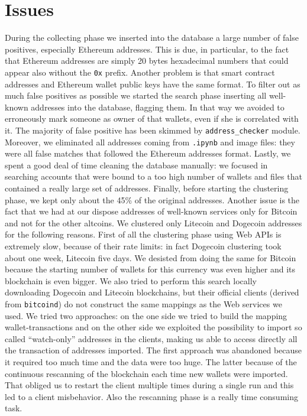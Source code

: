 \section{Issues} \label{sec:issues}
During the collecting phase we inserted into the database a large number of
false positives, especially Ethereum addresses. This is due, in particular, to
the fact that Ethereum addresses are simply 20 bytes hexadecimal numbers that
could appear also without the \texttt{0x} prefix. Another problem is that smart
contract addresses and Ethereum wallet public keys have the same format. To
filter out as much false positives as possible we started the search phase
inserting all well-known addresses into the database, flagging them. In that way
we avoided to erroneously mark someone as owner of that wallets, even if she is
correlated with it. The majority of false positive has been skimmed by
\texttt{address\_checker} module. Moreover, we eliminated all addresses coming
from \texttt{.ipynb} and image files: they were all false matches that
followed the Ethereum addresses format. Lastly, we spent a good deal of time
cleaning the database manually: we focused in searching accounts that were
bound to a too high number of wallets and files that contained
a really large set of addresses. 
Finally, before starting the clustering phase,
we kept only about the 45\% of the original addresses.
Another issue is the fact that we had at our dispose addresses
of well-known services only for Bitcoin and not for the other altcoins.
We clustered only Litecoin and Dogecoin addresses for the following reasons.
First of all the clustering phase using Web APIs is extremely slow, because of
their rate limits: in fact Dogecoin clustering took about one week, Litecoin
five days.
We desisted from doing the same for Bitcoin because the starting number of
wallets for this currency was even higher and its blockchain is even bigger. We
also tried to perform this search locally downloading Dogecoin and Litecoin
blockchains, but their official clients (derived from \texttt{bitcoind}) do not
construct the same mappings as the Web services we used. We tried two
approaches: on the one side we tried to build the mapping wallet-transactions
and on the other side we exploited the possibility to import so called
``watch-only'' addresses in the clients, making us able to access directly all
the transaction of addresses imported. The first approach was abandoned because
it required too much time and the data were too huge. The latter because of the
continuous rescanning of the blockchain each time new wallets were imported.
That obliged us to restart the client multiple times during a single run and
this led to a client misbehavior. Also the rescanning phase is a really
time consuming task.
